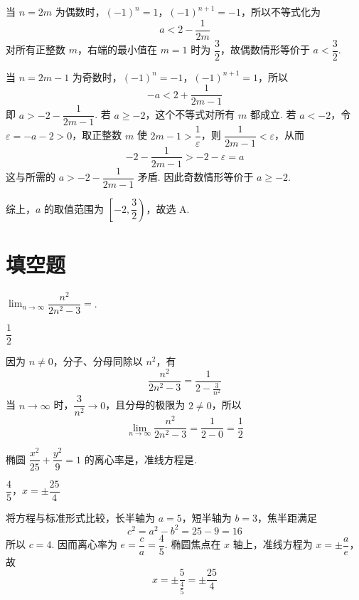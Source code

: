 \begin{solution}
当 \(n=2m\) 为偶数时，\((-1)^n=1\)，\((-1)^{n+1}=-1\)，所以不等式化为
\[
a<2-\frac{1}{2m}
\]
对所有正整数 \(m\)，右端的最小值在 \(m=1\) 时为 \(\dfrac32\)，故偶数情形等价于 \(a<\dfrac32\).

当 \(n=2m-1\) 为奇数时，\((-1)^n=-1\)，\((-1)^{n+1}=1\)，所以
\[
-a<2+\frac{1}{2m-1}
\]
即 \(a>-2-\dfrac{1}{2m-1}\). 若 \(a\geq-2\)，这个不等式对所有 \(m\) 都成立. 若 \(a<-2\)，令 \(\varepsilon=-a-2>0\)，取正整数 \(m\) 使 \(2m-1>\dfrac1\varepsilon\)，则 \(\dfrac1{2m-1}<\varepsilon\)，从而
\[
-2-\frac1{2m-1}>-2-\varepsilon=a
\]
这与所需的 \(a>-2-\dfrac1{2m-1}\) 矛盾. 因此奇数情形等价于 \(a\geq-2\).

综上，\(a\) 的取值范围为 \(\left[-2,\dfrac32\right)\)，故选 A.
\end{solution}

\section{填空题}
\begin{problem}
\(\displaystyle\lim_{n\to\infty}\dfrac{n^2}{2n^2-3}=\)\fillinblank{}.
\end{problem}

\begin{answer}
\(\dfrac12\)
\end{answer}

\begin{solution}
因为 \(n\ne0\)，分子、分母同除以 \(n^2\)，有
\[
\frac{n^2}{2n^2-3}=\frac{1}{2-\frac{3}{n^2}}
\]
当 \(n\to\infty\) 时，\(\dfrac{3}{n^2}\to0\)，且分母的极限为 \(2\ne0\)，所以
\[
\displaystyle\lim_{n\to\infty}\frac{n^2}{2n^2-3}=\frac{1}{2-0}=\frac12
\]
\end{solution}

\begin{problem}
椭圆 \(\dfrac{x^2}{25}+\dfrac{y^2}{9}=1\) 的离心率是\fillinblank{}，准线方程是\fillinblank{}.
\end{problem}

\begin{answer}
\(\dfrac45\)，\(x=\pm\dfrac{25}{4}\)
\end{answer}

\begin{solution}
将方程与标准形式比较，长半轴为 \(a=5\)，短半轴为 \(b=3\)，焦半距满足
\[
c^2=a^2-b^2=25-9=16
\]
所以 \(c=4\). 因而离心率为 \(e=\dfrac ca=\dfrac45\). 椭圆焦点在 \(x\) 轴上，准线方程为 \(x=\pm\dfrac ae\)，故
\[
x=\pm\frac{5}{\frac{4}{5}}=\pm\frac{25}{4}
\]
\end{solution}


